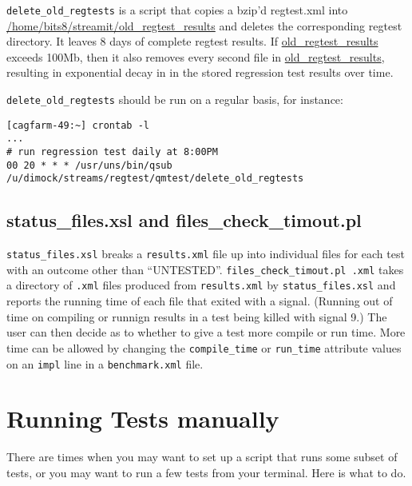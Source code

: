 \documentclass[11pt]{article}
\begin{document}
{\tt delete\_old\_regtests} is a script that copies a bzip'd regtest.xml
into \url{/home/bits8/streamit/old_regtest_results} and deletes the
corresponding regtest directory.
It leaves 8 days of complete regtest results.  If
\url{old_regtest_results} exceeds 100Mb, then it also removes every
second file in \url{old_regtest_results}, resulting in exponential
decay in in the stored regression test results over time.

{\tt delete\_old\_regtests} should be run on a regular basis, for
instance:
{\small{
\begin{verbatim}
[cagfarm-49:~] crontab -l
...
# run regression test daily at 8:00PM
00 20 * * * /usr/uns/bin/qsub /u/dimock/streams/regtest/qmtest/delete_old_regtests
\end{verbatim}
}}

\subsection{status\_files.xsl and files\_check\_timout.pl}
{\tt status\_files.xsl} breaks a {\tt results.xml} file up into
individual files for each test with an outcome other than
``UNTESTED''. 
{\tt files\_check\_timout.pl \*.xml} takes a directory of {\tt .xml}
files produced from  {\tt results.xml} by {\tt status\_files.xsl} and
reports the running time of each file that exited with a
signal. (Running out of time on compiling or runnign results in a test
being killed with signal 9.)  The user can then decide as to whether
to give a test more compile or run time.
More time can be allowed by changing the {\tt compile\_time}
or {\tt run\_time} attribute values on an {\tt impl} line in a 
{\tt benchmark.xml} file.

\section{Running Tests manually}

There are times when you may want to set up a script that runs some
subset of tests, or you may want to run a few tests from your
terminal.
Here is what to do.
\end{document}
